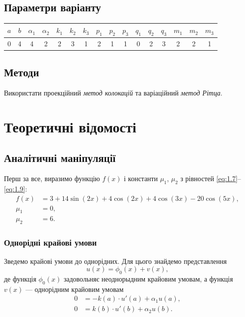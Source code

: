 \subsection{Параметри варіанту}

\begin{table}[H]
    \centering
    \begin{tabular}{|c|c||c|c||c|c|c||c|c|c||c|c|c||c|c|c|}
        \hline
        $a$ & $b$ & $\alpha_1$ & $\alpha_2$ & $k_1$ & $k_2$ & $k_3$ & $p_1$ & $p_2$ & $p_3$ & $q_1$ & $q_2$ & $q_3$ & $m_1$ & $m_2$ & $m_3$ \\ \hline
        0 & 4 & 4 & 2 & 2 & 3 & 1 & 2 & 1 & 1 & 0 & 2 & 3 & 2 & 2 & 1 \\ \hline
    \end{tabular}
\end{table}

\subsection{Методи}

Використати проекційний \emph{метод колокацій} та варіаційний \emph{метод Рітца}. 

\section{Теоретичні відомості}

\setcounter{subsection}{-1}
\subsection{Аналітичні маніпуляції}

Перш за все, виразимо функцію $f(x)$ і константи $\mu_1$, $\mu_2$ з рівностей \eqref{eq:1.7}--\eqref{eq:1.9}:
\begin{align}
    \label{eq:2.0.1}
    f(x) &= 3 + 14 \sin(2 x) + 4 \cos(2 x) + 4 \cos(3 x) - 20 \cos(5 x), \\
    \label{eq:2.0.2}
    \mu_1 &= 0, \\
    \label{eq:2.0.3}
    \mu_2 &= 6.
\end{align}

\subsubsection{Однорідні крайові умови}

Зведемо крайові умови до однорідних. Для цього знайдемо представлення
\begin{equation}
    \label{eq:2.0.4}
    u(x) = \phi_0(x) + v(x),
\end{equation}
де функція $\phi_0(x)$ задовольняє неоднорыдним крайовим умовам, а функція $v(x)$ --- однорідним крайовим умовам
\begin{align}
    \label{eq:2.0.5}
    0 &= -k(a) \cdot u'(a) + \alpha_1 u(a), \\
    \label{eq:2.0.6}
    0 &= k(b) \cdot u'(b) + \alpha_2 u(b).
\end{align}

